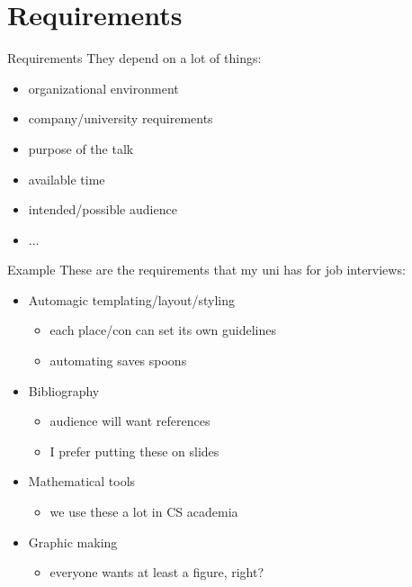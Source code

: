 \documentclass[aspectratio=169]{fireshonks}
\begin{document}
\section{Requirements}
\begin{frame}{Requirements}
  They depend on a lot of things:
  \begin{itemize}
    \item organizational environment
    \item company/university requirements
    \item purpose of the talk
    \item available time
    \item intended/possible audience
    \item ...
  \end{itemize}
\end{frame}
\begin{frame}{Example}
  These are the requirements that my uni has for job interviews:

  \begin{itemize}
    \item Automagic templating/layout/styling
          \begin{itemize}
            \item each place/con can set its own guidelines
            \item automating saves spoons
          \end{itemize}
    \item Bibliography
          \begin{itemize}
            \item audience will want references
            \item I prefer putting these on slides
          \end{itemize}
    \item Mathematical tools
          \begin{itemize}
            \item we use these a lot in CS academia
          \end{itemize}
    \item Graphic making
          \begin{itemize}
            \item everyone wants at least a figure, right? 
          \end{itemize}
  \end{itemize}
\end{frame}
\end{document}

